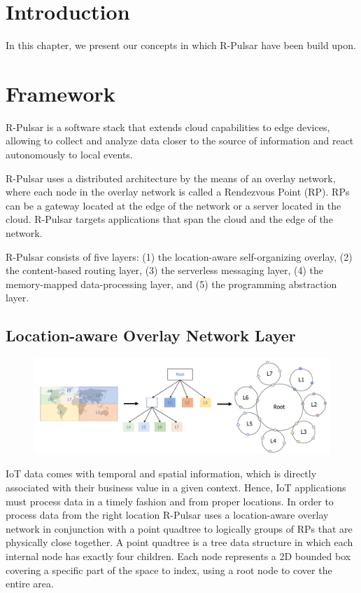 \section{Introduction}
In this chapter, we present our concepts in which R-Pulsar have been build upon.

\section{Framework}

R-Pulsar is a software stack that extends cloud capabilities to edge devices, allowing to collect and analyze data closer to the source of information and react autonomously to local events.

R-Pulsar uses a distributed architecture by the means of an overlay network, where each node in the overlay network is called a Rendezvous Point (RP). RPs can be a gateway located at the edge of the network or a server located in the cloud. R-Pulsar targets applications that span the cloud and the edge of the network.

R-Pulsar consists of five layers: (1) the location-aware self-organizing overlay, (2) the content-based routing layer, (3) the serverless messaging layer, (4) the memory-mapped data-processing layer, and (5) the programming abstraction layer.

\subsection{Location-aware Overlay Network Layer}

\begin{figure}[!h]
  \centering
  \includegraphics[width=1\columnwidth]{Figures/quadtree.pdf}
  \caption{}\label{fig:quadT}
\end{figure}

IoT data comes with temporal and spatial information, which is directly associated with their business value in a given context. Hence, IoT applications must process data in a timely fashion and from proper locations. In order to process data from the right location R-Pulsar uses a location-aware overlay network in conjunction with a point quadtree to logically groups of RPs that are physically close together. A point quadtree is a tree data structure in which each internal node has exactly four children. Each node represents a 2D bounded box covering a specific part of the space to index, using a root node to cover the entire area.

